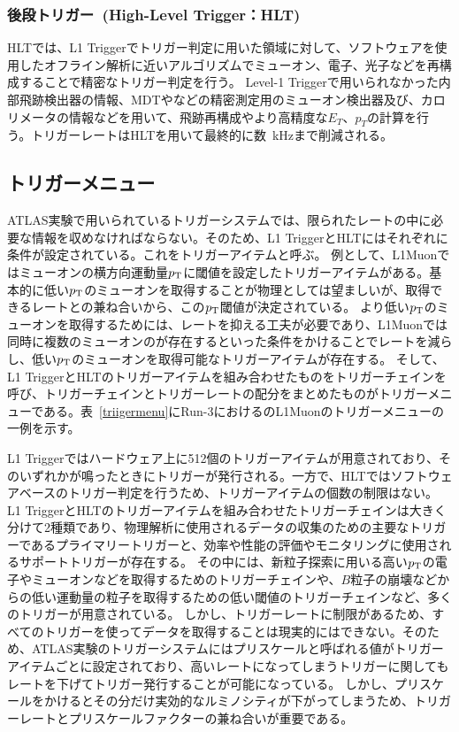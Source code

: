 \subsubsection{後段トリガー~(High-Level Trigger：HLT)}
HLTでは、L1 Triggerでトリガー判定に用いた領域に対して、ソフトウェアを使用したオフライン解析に近いアルゴリズムでミューオン、電子、光子などを再構成することで精密なトリガー判定を行う。
Level-1 Triggerで用いられなかった内部飛跡検出器の情報、MDTやなどの精密測定用のミューオン検出器及び、カロリメータの情報などを用いて、飛跡再構成やより高精度な$E_T$、$p_T$の計算を行う。トリガーレートはHLTを用いて最終的に数~kHzまで削減される。

\subsection{トリガーメニュー}
ATLAS実験で用いられているトリガーシステムでは、限られたレートの中に必要な情報を収めなければならない。そのため、L1 TriggerとHLTにはそれぞれに条件が設定されている。これをトリガーアイテムと呼ぶ。
例として、L1Muonではミューオンの横方向運動量$p_{\rm{T}}$に閾値を設定したトリガーアイテムがある。基本的に低い$p_{\rm{T}}$のミューオンを取得することが物理としては望ましいが、取得できるレートとの兼ね合いから、この$p_{\rm{T}}$閾値が決定されている。
より低い$p_{\rm{T}}$のミューオンを取得するためには、レートを抑える工夫が必要であり、L1Muonでは同時に複数のミューオンのが存在するといった条件をかけることでレートを減らし、低い$p_{\rm{T}}$のミューオンを取得可能なトリガーアイテムが存在する。
そして、L1 TriggerとHLTのトリガーアイテムを組み合わせたものをトリガーチェインを呼び、トリガーチェインとトリガーレートの配分をまとめたものがトリガーメニューである。表~\ref{triigermenu}にRun-3におけるのL1Muonのトリガーメニューの一例を示す。

L1 Triggerではハードウェア上に512個のトリガーアイテムが用意されており、そのいずれかが鳴ったときにトリガーが発行される。一方で、HLTではソフトウェアベースのトリガー判定を行うため、トリガーアイテムの個数の制限はない。
L1 TriggerとHLTのトリガーアイテムを組み合わせたトリガーチェインは大きく分けて2種類であり、物理解析に使用されるデータの収集のための主要なトリガーであるプライマリートリガーと、効率や性能の評価やモニタリングに使用されるサポートトリガーが存在する。
その中には、新粒子探索に用いる高い$p_{\rm{T}}$の電子やミューオンなどを取得するためのトリガーチェインや、$B$粒子の崩壊などからの低い運動量の粒子を取得するための低い閾値のトリガーチェインなど、多くのトリガーが用意されている。
しかし、トリガーレートに制限があるため、すべてのトリガーを使ってデータを取得することは現実的にはできない。そのため、ATLAS実験のトリガーシステムにはプリスケールと呼ばれる値がトリガーアイテムごとに設定されており、高いレートになってしまうトリガーに関してもレートを下げてトリガー発行することが可能になっている。
しかし、プリスケールをかけるとその分だけ実効的なルミノシティが下がってしまうため、トリガーレートとプリスケールファクターの兼ね合いが重要である。



